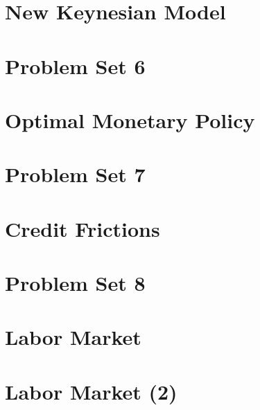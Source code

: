 \documentclass[a4paper, 11pt]{report}
\begin{document}
\chapter{New Keynesian Model}

\chapter{Problem Set 6}

\chapter{Optimal Monetary Policy}

\chapter{Problem Set 7}

\chapter{Credit Frictions}

\chapter{Problem Set 8}

\chapter{Labor Market}

\chapter{Labor Market (2)}




\end{document}

